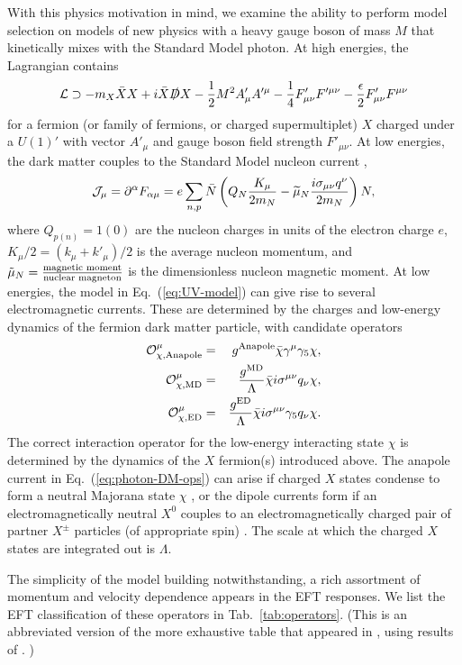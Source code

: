 \documentclass[11pt]{article}
\newcommand{\pL}{\left(} \newcommand{\pR}{\right)} \newcommand{\bL}{\left[} \newcommand{\bR}{\right]} \newcommand{\cbL}{\left\{} \newcommand{\cbR}{\right\}} \newcommand{\mL}{\left|} \newcommand{\mR}{\right|}
\newcommand{\beq}{\begin{equation}} \newcommand{\eeq}{\end{equation}}
\newcommand{\Eq}[1]{Eq.~(\ref{#1})} \newcommand{\Eqs}[2]{Eqs.~(\ref{#1}) and (\ref{#2})} \newcommand{\Eqm}[2]{Eqs.~(\ref{#1}) through (\ref{#2})}
\newcommand{\Tab}[1]{Tab.~\ref{#1}}
\begin{document}
With this physics motivation in mind, we examine the ability to perform model selection on models of new physics with a heavy gauge boson of mass $M$ that kinetically mixes with the Standard Model photon. At high energies, the Lagrangian contains
\beq \label{eq:UV-model}
\cL \supset -  m_X \bar X X + i \bar X \slashed D X  - \frac12 M^2 A'_\mu A'^\mu  - \frac14 F'_{\mu \nu} F'^{\mu \nu} - \frac\epsilon2 F'_{\mu \nu} F^{\mu \nu}
\eeq
for a fermion (or family of fermions, or charged supermultiplet) $X$ charged under a $U(1)'$ with vector $A'_\mu$ and gauge boson field strength $F'_{\mu \nu}$. At low energies, the dark matter couples to the Standard Model nucleon current \cite{Gresham:2014vja},
\beq \label{eq:current}
\cJ_\mu = \partial^\alpha F_{\alpha \mu} = e \sum_{n,p} \bar N \pL Q_N \frac{K_\mu}{2m_N} -\widetilde \mu_N \frac{i \sigma_{\mu \nu}q^\nu}{2m_N} \pR N,
\eeq 
where $Q_{p(n)}=1(0)$ are the nucleon charges in units of the electron charge $e$, $K_\mu/2 = (k_\mu + k'_\mu)/2$ is the average nucleon momentum, and $\tilde{\mu}_N = {\text{magnetic moment} \over \text{nuclear magneton}}$ is the dimensionless nucleon magnetic moment. At low energies, the model in \Eq{eq:UV-model} can give rise to several electromagnetic currents. These are determined by the charges and low-energy dynamics of the fermion dark matter particle, with candidate operators \cite{Gresham:2014vja, Gluscevic:2015sqa}
\begin{eqnarray} \label{eq:photon-DM-ops}
{\cal O}_{\rm \chi, Anapole}^\mu & = & g^{\rm Anapole}\bar \chi \gamma^\mu \gamma_5 \chi, \\
{\cal O}_{\rm \chi, MD}^\mu & = & \frac{g^{\rm MD}}{\Lambda}\bar \chi i \sigma^{\mu \nu} q_\nu \chi ,\\
{\cal O}_{\rm \chi, ED}^\mu & = & \frac{g^{\rm ED}}{\Lambda} \bar \chi i \sigma^{\mu \nu} \gamma_5 q_\nu \chi.
\end{eqnarray}
The correct interaction operator for the low-energy interacting state $\chi$ is determined by the dynamics of the $X$ fermion(s) introduced above. The anapole current in \Eq{eq:photon-DM-ops} can arise if charged $X$ states condense to form a neutral Majorana state $\chi$ \cite{Bagnasco:1993st}, or the dipole currents form if an electromagnetically neutral $X^0$ couples to an electromagnetically charged pair of partner $X^\pm$ particles (of appropriate spin) \cite{Weiner:2012gm}. The scale at which the charged $X$ states are integrated out is $\Lambda$.

The simplicity of the model building notwithstanding, a rich assortment of momentum and velocity dependence appears in the EFT responses. We list the EFT classification of these operators in \Tab{tab:operators}. (This is an abbreviated version of the more exhaustive table that appeared in \cite{Gluscevic:2015sqa}, using results of \cite{Gresham:2014vja, Gluscevic:2015sqa}.%
)
\end{document}
